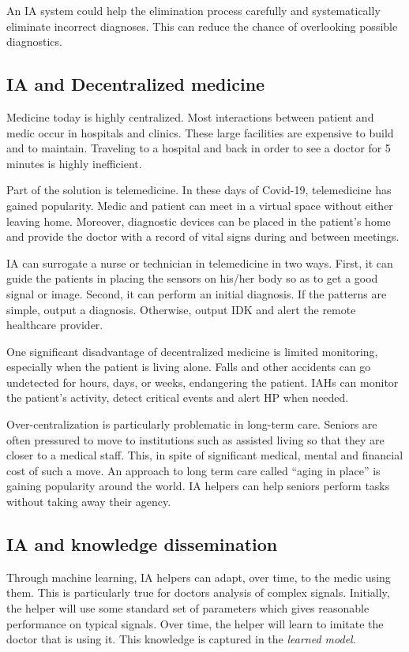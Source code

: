 \documentclass[11pt]{pnas-new}
\begin{document}
An IA system could help the elimination process carefully and
systematically eliminate incorrect diagnoses. This can reduce the chance of overlooking possible diagnostics.

\subsection{IA and Decentralized medicine}

Medicine today is highly centralized. Most interactions
between patient and medic occur in hospitals and clinics. These
large facilities are expensive to build and to maintain. Traveling to
a hospital and back in order to see a doctor for 5 minutes is highly
inefficient. 

Part of the solution is telemedicine. In these days of Covid-19,
telemedicine has gained popularity. Medic and patient can meet in a
virtual space without either leaving home. Moreover, diagnostic
devices can be placed in the patient's home and provide the doctor with
{a record of vital signs during and between meetings.}


IA can surrogate a nurse or technician in telemedicine in two ways. First,
it can guide the patients in placing the sensors on his/her
body so as to get a good signal or image. Second, it can perform an
initial diagnosis. If the patterns are simple, output a diagnosis.
Otherwise, output IDK and alert the remote healthcare provider. 

One significant disadvantage of decentralized medicine is {limited} monitoring, especially when the patient is living alone. 
Falls and other accidents can go undetected for hours, days, or weeks, endangering the patient. IAHs can monitor the patient's activity, detect critical events and alert HP when needed.

Over-centralization is particularly problematic in long-term care.
Seniors are often pressured to move to institutions such as
assisted living so that they are closer to a medical staff. This, in
spite of significant medical, mental and financial cost of such a
move. An approach to long term care called ``aging in
place'' is gaining popularity around the world. IA helpers can help
seniors perform tasks without taking away their agency.


\subsection{IA and knowledge dissemination}

Through machine learning, IA helpers can adapt, over time, to the
medic using them. This is particularly true for  doctors  analysis of complex signals. Initially, the helper will
use some standard set of parameters which gives reasonable performance on
typical signals. Over time, the helper will learn to imitate the
doctor that is using it. This knowledge is captured in the  {\em learned model}.
\end{document}
